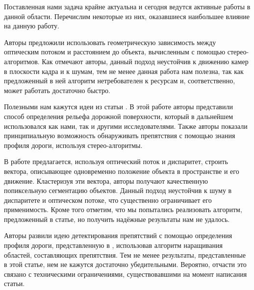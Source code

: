 \documentclass[aps,%
14pt,%
final,%
oneside,
onecolumn,%
musixtex, %
superscriptaddress,%
centertags]{extarticle} %
\begin{document}









Поставленная нами задача крайне актуальна и сегодня ведутся активные работы в данной области. Перечислим некоторые из них, оказавшиеся наибольшее влияние на данную работу.

Авторы \cite{heinrich2002fast} предложили использовать геометрическую зависимость между оптическим потоком и расстоянием до объекта, вычисленным с помощью стерео-алгоритмов. Как отмечают авторы, данный подход неустойчив к движению камер в плоскости кадра и к шумам, тем не менее данная работа нам полезна, так как предложенный в ней алгоритм нетребователен к ресурсам и, соответственно, может работать достаточно быстро.

Полезными нам кажутся идеи из статьи \cite{labayrade2002real}. В этой работе авторы представили способ определения рельефа дорожной поверхности, который в дальнейшем использовался как нами, так и другими исследователями. Также авторы показали принципиальную возможность обнаруживать препятствия с помощью знания профиля дороги, используя стерео-алгоритмы.

В работе \cite{franke20056d} предлагается, используя оптический поток и диспаритет, строить вектора, описывающее одновременно положение объекта в пространстве и его движение. Кластеризуя эти вектора, авторы получают качественную попиксельную сегментацию объектов. Данный подход неустойчив к шуму в диспаритете и оптическом потоке, что существенно ограничивает его применимость. Кроме того отметим, что мы попытались реализовать алгоритм, предложенный в статье, но получить надёжные результаты нам не удалось.

Авторы \cite{broggi2006single} развили идею детектирования препятствий с помощью определения профиля дороги, представленную в \cite{labayrade2002real}, использовав алгоритм наращивания областей, составляющих препятствия. Тем не менее результаты, представленные в этой статье, нем не кажутся достаточно убедительными. Вероятно, отчасти это связано с техническими ограничениями, существовавшими на момент написания статьи.
\end{document}
